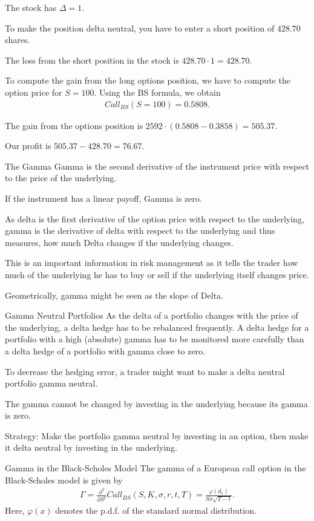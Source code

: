 	The stock has $\Delta=1$.
   
	To make the position delta neutral, you have to enter a short position
  of $428.70$ shares.

	The loss from the short position in the stock is $428.70 \cdot
  1=428.70$.
  
	To compute the gain from the long options position, we have to compute
  the option price for $S=100$. Using the BS formula, we obtain
		\begin{align*}
			Call_{BS}(S=100) = 0.5808.
		\end{align*}
   
	The gain from the options position is $2592\cdot(0.5808-0.3858)=505.37$.
  
	Our profit is $505.37-428.70=76.67$.


The Gamma
	Gamma is the second derivative of the instrument price with respect to
  the price of the underlying.
  
	If the instrument has a linear payoff, Gamma is zero.
  
	As delta is the first derivative of the option price with respect to the
  underlying, gamma is the derivative of delta with respect to the underlying
  and thus measures, how much Delta changes if the underlying changes.
  
	This is an important information in risk management as it tells the
  trader how much of the underlying he has to buy or sell if the underlying
  itself changes price.
  
	Geometrically, gamma might be seen as the slope of Delta.


Gamma Neutral Portfolios
As the delta of a portfolio changes with the price of the underlying, a delta
hedge has to be rebalanced frequently.
	A delta hedge for a portfolio with a high (absolute) gamma has to be
  monitored more carefully than a delta hedge of a portfolio with gamma close to
  zero.
  
	To decrease the hedging error, a trader might want to make a delta
  neutral portfolio gamma neutral.
  
	The gamma cannot be changed by investing in the underlying because its
  gamma is zero.
  
	Strategy: Make the portfolio gamma neutral by investing in an option,
  then make it delta neutral by investing in the underlying.


Gamma in the Black-Scholes Model
	The gamma of a European call option in the Black-Scholes model is given by
	\begin{align*}
		\Gamma = \frac{\partial^2}{\partial S^2}Call_{BS}(S,K,\sigma,r,t,T) =
		\frac{\varphi(d_1)}{S\sigma \sqrt{T-t}}.
	\end{align*}
	Here, $\varphi(x)$ denotes the p.d.f. of the standard normal distribution.


